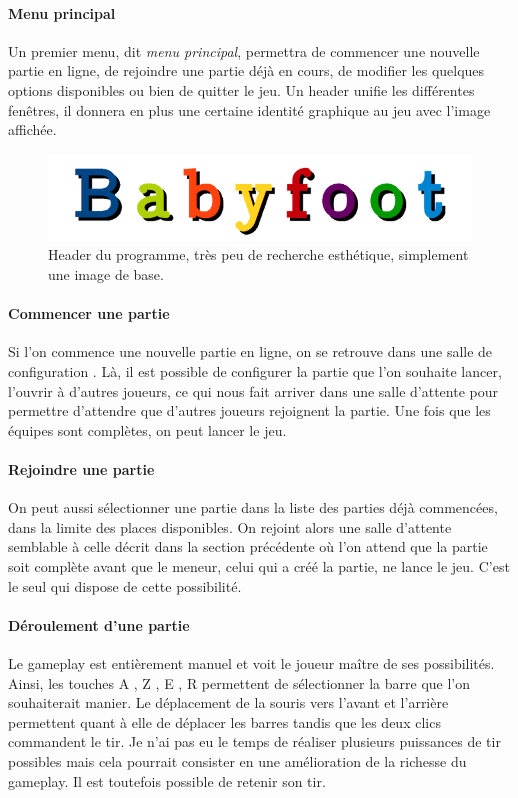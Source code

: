 \documentclass[a4paper,12pt]{report}
\begin{document}
\paragraph{Menu principal}
Un premier menu, dit \emph{menu principal}, permettra de commencer une nouvelle partie en ligne, de rejoindre une partie
déjà en cours, de modifier les quelques options disponibles ou bien de quitter le jeu. Un header unifie les différentes fenêtres, il donnera en plus une certaine identité graphique au jeu avec l'image affichée.
    
    \begin{figure}[H]
	\begin{center}
	\includegraphics[width=17cm]{pictures/header.png} 
	\end{center}
	\caption{Header du programme, très peu de recherche esthétique, simplement une image de base.}
    \end{figure}
\paragraph{Commencer une partie}
Si l'on commence une nouvelle partie en ligne, on se retrouve dans une \og salle de configuration \fg. Là, il est possible de configurer la partie que l'on souhaite lancer, l'ouvrir à d'autres joueurs, ce qui nous fait arriver dans une \og salle d'attente \fg pour permettre d'attendre que d'autres joueurs rejoignent la partie. Une fois que les équipes sont complètes, on peut lancer le jeu.
\paragraph{Rejoindre une partie}
On peut aussi sélectionner une partie dans la liste des parties déjà commencées, dans la limite des places disponibles. On rejoint alors une \og salle d'attente \fg semblable à celle décrit dans la section précédente où l'on attend que la partie soit complète avant que le meneur, celui qui a créé la partie, ne lance le jeu. C'est le seul qui dispose de cette possibilité.
\paragraph{Déroulement d'une partie}
Le gameplay est entièrement manuel et voit le joueur maître de ses possibilités. Ainsi, les touches \og A \fg, \og Z \fg, \og E \fg, \og R \fg permettent de sélectionner la barre que l'on souhaiterait manier. Le déplacement de la souris vers l'avant et l'arrière permettent quant à elle de déplacer les barres tandis que les deux clics commandent le tir. Je n'ai pas eu le temps de réaliser plusieurs puissances de tir possibles mais cela pourrait consister en une amélioration de la richesse du gameplay. Il est toutefois possible de retenir son tir.
\end{document}
